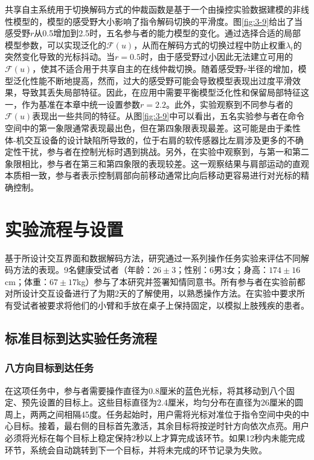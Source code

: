 共享自主系统用于切换解码方式的仲裁函数是基于一个由操控实验数据建模的非线性模型的，模型的感受野大小影响了指令解码切换的平滑度。图\ref{fig:3-9}给出了当感受野$r$从0.5增加到2.5时，五名参与者的能力模型的变化。通过选择合适的局部模型参数，可以实现泛化的$\mathcal{F}(u)$，从而在解码方式的切换过程中防止权重$\lambda_t$的突然变化导致的光标抖动。当$r=0.5$时，由于感受野过小因此无法建立可用的$\mathcal{F}(u)$，使其不适合用于共享自主的在线仲裁切换。随着感受野$r$半径的增加，模型泛化性能不断地提高，然而，过大的感受野可能会导致模型表现出过度平滑效果，导致其丢失局部特征。因此，在应用中需要平衡模型泛化性和保留局部特征这一，作为基准在本章中统一设置参数$r=2.2$。此外，实验观察到不同参与者的$\mathcal{F}(u)$表现出一些共同的特征。从图\ref{fig:3-9}中可以看出，五名实验参与者在命令空间中的第一象限通常表现最出色，但在第四象限表现最差。这可能是由于柔性体-机交互设备的设计缺陷所导致的，位于右肩的软传感器比左肩涉及更多的不确定性干扰，参与者在控制光标时遇到挑战。另外，在实验中观察到，与第一和第二象限相比，参与者在第三和第四象限的表现较差。这一观察结果与肩部运动的直观本质相一致，参与者表示控制肩部向前移动通常比向后移动更容易进行对光标的精确控制。  

\section{实验流程与设置}基于所设计交互界面和数据解码方法，研究通过一系列操作任务实验来评估不同解码方法的表现。9名健康受试者（年龄：$26\pm3$；性别：6男3女；身高：$174\pm16$cm；体重：$67\pm17$kg）参与了本研究并签署知情同意书。所有参与者在实验前都对所设计交互设备进行了为期2天的了解使用，以熟悉操作方法。在实验中要求所有受试者被要求将他们的小臂和手放在桌子上保持固定，以模拟上肢残疾的患者。

\subsection{标准目标到达实验任务流程}   
    \subsubsection{八方向目标到达任务}在这项任务中，参与者需要操作直径为0.8厘米的蓝色光标，将其移动到八个固定、预先设置的目标上。这些目标直径为2.4厘米，均匀分布在直径为26厘米的圆周上，两两之间相隔45度。任务起始时，用户需将光标对准位于指令空间中央的中心目标。接着，最右侧的目标首先激活，其余目标将按逆时针方向依次点亮。用户必须将光标在每个目标上稳定保持2秒以上才算完成该环节。如果12秒内未能完成环节，系统会自动跳转到下一个目标，并将未完成的环节记录为失败。

